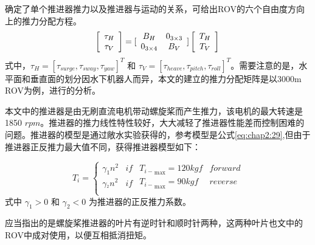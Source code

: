 确定了单个推进器推力以及推进器与运动的关系，可给出ROV的六个自由度方向上的推力分配方程。
\begin{equation}
\label{eq:chap2:thrustconfigure_2}
     \left[ \begin{array}{*{20}{c}}
     \tau_H\\
     \tau_V\\
     \end{array}\right]
      =
     [\begin{array}{*{20}{c}}
     {{B_H}} & {0_{3\times3}}  \\
     {0_{3\times4}} & {{B_V}}  \\
     \end{array}]\left[ {\begin{array}{*{20}{c}}
     {{T_H}}  \\
     {{T_V}}  \\
     \end{array}} \right] \\
\end{equation}
式中，$\tau_H = [\tau_{surge},\tau_{sway},\tau_{yaw}]^T$ 和 $\tau_V=[\tau_{heave},\tau_{pitch},\tau_{roll}]^T$。需要注意的是，水平面和垂直面的划分因水下机器人而异，本文的建立的推力分配矩阵是以3000m ROV为例，进行的分析。

本文中的推进器是由无刷直流电机带动螺旋桨而产生推力，该电机的最大转速是1850 $rpm$。推进器的推力线性特性较好，大大减轻了推进器性能差而控制困难的问题。推进器的模型是通过敞水实验获得的，参考模型是公式\ref{eq:chap2:29},但由于推进器正反推力最大值不同，获得推进器模型如下\cite{wunl2011immune}：

\begin{equation}
\label{eq:8}
{T_i} = \left\{ {\begin{array}{*{20}{c}}
   {{\gamma _1}{n^2}} & {if}  \\
   {{\gamma _{^2}}{n^2}} & {if}  \\
\end{array}} \right.\begin{array}{*{20}{c}}
   {{T_{i - }}_{\max } = 120kgf} & {forward}  \\
   {{T_{i - }}_{\max } = 90kgf } & {reverse}  \\
\end{array}
\end{equation}
式中 $\gamma _1 > 0$ 和 $\gamma _2 < 0$ 为推进器的正反推力系数。

应当指出的是螺旋桨推进器的叶片有逆时针和顺时针两种，这两种叶片也文中的ROV中成对使用，以便互相抵消扭矩。

